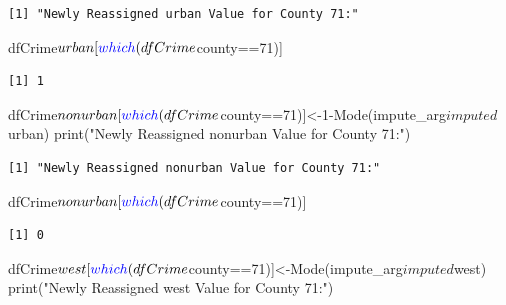 \documentclass[]{article}
\newenvironment{Shaded}{}{}
\newcommand{\DecValTok}[1]{#1}
\newcommand{\KeywordTok}[1]{\textcolor[rgb]{0.00,0.00,1.00}{#1}}
\newcommand{\NormalTok}[1]{#1}
\newcommand{\OperatorTok}[1]{#1}
\newcommand{\StringTok}[1]{\textcolor[rgb]{0.00,0.50,0.50}{#1}}
\begin{document}
\begin{verbatim}
[1] "Newly Reassigned urban Value for County 71:"
\end{verbatim}

\begin{Shaded}
\begin{Highlighting}[]
\NormalTok{dfCrime}\OperatorTok{$}\NormalTok{urban[}\KeywordTok{which}\NormalTok{(dfCrime}\OperatorTok{$}\NormalTok{county}\OperatorTok{==}\DecValTok{71}\NormalTok{)]}
\end{Highlighting}
\end{Shaded}

\begin{verbatim}
[1] 1
\end{verbatim}

\begin{Shaded}
\begin{Highlighting}[]
\NormalTok{dfCrime}\OperatorTok{$}\NormalTok{nonurban[}\KeywordTok{which}\NormalTok{(dfCrime}\OperatorTok{$}\NormalTok{county}\OperatorTok{==}\DecValTok{71}\NormalTok{)]<-}\DecValTok{1}\OperatorTok{-}\KeywordTok{Mode}\NormalTok{(impute_arg}\OperatorTok{$}\NormalTok{imputed}\OperatorTok{$}\NormalTok{urban)}
\KeywordTok{print}\NormalTok{(}\StringTok{"Newly Reassigned nonurban Value for County 71:"}\NormalTok{)}
\end{Highlighting}
\end{Shaded}

\begin{verbatim}
[1] "Newly Reassigned nonurban Value for County 71:"
\end{verbatim}

\begin{Shaded}
\begin{Highlighting}[]
\NormalTok{dfCrime}\OperatorTok{$}\NormalTok{nonurban[}\KeywordTok{which}\NormalTok{(dfCrime}\OperatorTok{$}\NormalTok{county}\OperatorTok{==}\DecValTok{71}\NormalTok{)]}
\end{Highlighting}
\end{Shaded}

\begin{verbatim}
[1] 0
\end{verbatim}

\begin{Shaded}
\begin{Highlighting}[]
\NormalTok{dfCrime}\OperatorTok{$}\NormalTok{west[}\KeywordTok{which}\NormalTok{(dfCrime}\OperatorTok{$}\NormalTok{county}\OperatorTok{==}\DecValTok{71}\NormalTok{)]<-}\KeywordTok{Mode}\NormalTok{(impute_arg}\OperatorTok{$}\NormalTok{imputed}\OperatorTok{$}\NormalTok{west)}
\KeywordTok{print}\NormalTok{(}\StringTok{"Newly Reassigned west Value for County 71:"}\NormalTok{)}
\end{Highlighting}
\end{Shaded}
\end{document}
